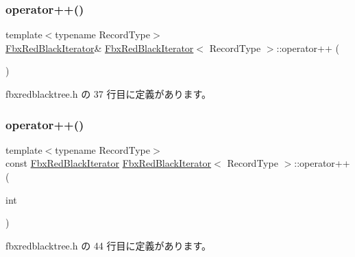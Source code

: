 \mbox{\label{class_fbx_red_black_iterator_a1ea196cc2fcdc233f26ba205741c8d08}} 
\subsubsection{\texorpdfstring{operator++()}{operator++()}\hspace{0.1cm}{\footnotesize\ttfamily [1/2]}}
{\footnotesize\ttfamily template$<$typename Record\+Type$>$ \\
\hyperlink{class_fbx_red_black_iterator}{Fbx\+Red\+Black\+Iterator}\& \hyperlink{class_fbx_red_black_iterator}{Fbx\+Red\+Black\+Iterator}$<$ Record\+Type $>$\+::operator++ (\begin{DoxyParamCaption}{ }\end{DoxyParamCaption})\hspace{0.3cm}{\ttfamily [inline]}}



 fbxredblacktree.\+h の 37 行目に定義があります。

\mbox{\label{class_fbx_red_black_iterator_a58492d2dddc2067ca0cec9bd8348d2cd}} 
\subsubsection{\texorpdfstring{operator++()}{operator++()}\hspace{0.1cm}{\footnotesize\ttfamily [2/2]}}
{\footnotesize\ttfamily template$<$typename Record\+Type$>$ \\
const \hyperlink{class_fbx_red_black_iterator}{Fbx\+Red\+Black\+Iterator} \hyperlink{class_fbx_red_black_iterator}{Fbx\+Red\+Black\+Iterator}$<$ Record\+Type $>$\+::operator++ (\begin{DoxyParamCaption}\item[{int}]{ }\end{DoxyParamCaption})\hspace{0.3cm}{\ttfamily [inline]}}



 fbxredblacktree.\+h の 44 行目に定義があります。

